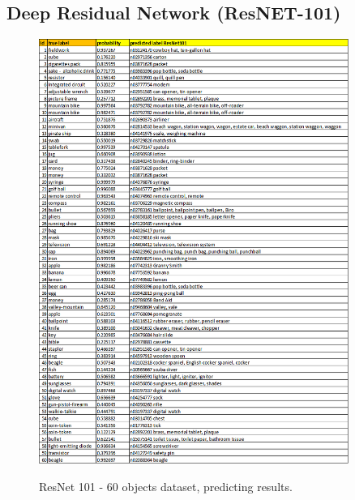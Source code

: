 \documentclass[12pt]{article}
\numberwithin{equation}{section}
\numberwithin{table}{section}
\numberwithin{figure}{section}
\begin{document}
\subsection{Deep Residual Network (ResNET-101)}
\begin{figure}[H] \centering
	\caption{ResNet 101 - 60 objects dataset, predicting results.}
	\includegraphics[width=0.9\textwidth]{resnet101.png}
	\label{r1}
\end{figure}

\end{document}
